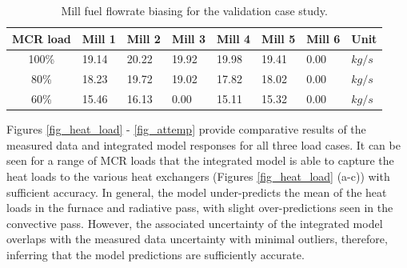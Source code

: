 \documentclass[a4paper,fleqn]{cas-sc}
\begin{document}
\begin{table}[h!]
\caption{Mill fuel flowrate biasing for the validation case study.}\label{tbl_fuel_bias}
\begin{tabular*}{\tblwidth}{c p{}p{}p{}p{}p{}p{}p{}}
\toprule
 MCR load& Mill 1 & Mill 2 &Mill 3 &Mill 4 &Mill 5 &Mill 6 & Unit \\ %
\midrule
 100\% & 19.14 & 20.22 & 19.92 & 19.98 & 19.41 & 0.00 & $kg/s$  \\
 80\% & 18.23 & 19.72 & 19.02 & 17.82 & 18.02 & 0.00 & $kg/s$  \\
 60\% & 15.46 & 16.13 & 0.00 & 15.11 & 15.32 & 0.00 & $kg/s$  \\
\bottomrule
\end{tabular*}
\end{table}  

Figures \ref{fig_heat_load} - \ref{fig_attemp} provide comparative results of the measured data and integrated model responses for all three load cases. It can be seen for a range of MCR loads that the integrated model is able to capture the heat loads to the various heat exchangers (Figures \ref{fig_heat_load} (a-c)) with sufficient accuracy. In general, the model under-predicts the mean of the heat loads in the furnace and radiative pass, with slight over-predictions seen in the convective pass. However, the associated uncertainty of the integrated model overlaps with the measured data uncertainty with minimal outliers, therefore, inferring that the model predictions are sufficiently accurate.\\ 
\end{document}
